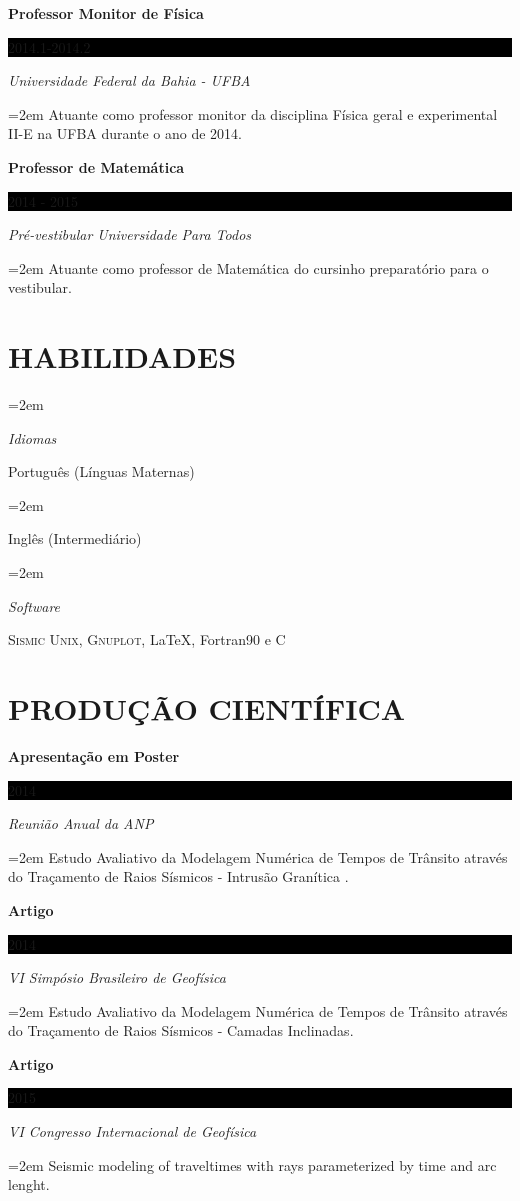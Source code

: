 \documentclass[paper=a4,fontsize=11pt]{scrartcl}                %
\newlength{\spacebox}
\newcommand{\sepspace}{\vspace*{1em}}           %
\newcommand{\NewPart}[1]{\section*{\uppercase{#1}}}
\newcommand{\PersonalEntry}[2]{
        \noindent\hangindent=2em\hangafter=0        %
        \parbox{\spacebox}{                     %
        \textit{#1}}                                %
        \hspace{1.5em} #2 \par}                 %
\newcommand{\SkillsEntry}[2]{                       %
        \noindent\hangindent=2em\hangafter=0        %
        \parbox{\spacebox}{                     %
        \textit{#1}}                                %
        \hspace{1.5em} #2 \par}                 %
\newcommand{\EducationEntry}[4]{
        \noindent \textbf{#1} \hfill                    %
        \colorbox{Black}{%
            \parbox{10em}{%
            \hfill\color{White}#2}} \par                %
        \noindent \textit{#3} \par                  %
        \noindent\hangindent=2em\hangafter=0 \small #4  %
        \normalsize \par}
\begin{document}
\EducationEntry{Professor Monitor de F\'isica}{2014.1-2014.2}{Universidade Federal da Bahia - UFBA}{Atuante como professor monitor da disciplina F\'isica geral e experimental II-E na UFBA durante o ano de 2014.}
\sepspace
\EducationEntry{Professor de Matem\'atica}{2014 - 2015}{Pr\'e-vestibular Universidade Para Todos}{Atuante como professor de Matem\'atica do cursinho preparat\'orio para o vestibular.}%


\NewPart{Habilidades}{}

\SkillsEntry{Idiomas}{Portugu\^ es (L\'inguas Maternas)}
\SkillsEntry{}{Ingl\^es (Intermedi\'ario)}

\SkillsEntry{Software}{\textsc{Sismic Unix}, \textsc{Gnuplot},  \LaTeX, Fortran90 e C }


\NewPart{Produ\c c\~ao Cient\'ifica}{}
\EducationEntry{Apresenta\c c\~ao em Poster}{2014}{Reuni\~ao Anual da ANP}{Estudo Avaliativo da  Modelagem Num\'erica de Tempos de Tr\^ansito atrav\'es do Tra\c camento de Raios S\'ismicos - Intrus\~ao Gran\'itica .}
\sepspace
\EducationEntry{Artigo}{2014}{VI Simp\'osio Brasileiro de Geof\'isica}{Estudo Avaliativo da  Modelagem Num\'erica de Tempos de Tr\^ansito atrav\'es do Tra\c camento de Raios S\'ismicos - Camadas Inclinadas.}
\EducationEntry{Artigo}{2015}{VI Congresso Internacional de  Geof\'isica}{Seismic modeling of traveltimes with  rays parameterized by time and arc lenght.}
\sepspace
\end{document}
